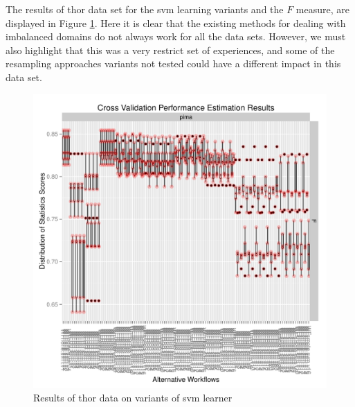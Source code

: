 \documentclass[10pt,a4paper]{article}\usepackage[]{graphicx}\usepackage[]{color}
\makeatletter
\def\maxwidth{ %
  \ifdim\Gin@nat@width>\linewidth
    \linewidth
  \else
    \Gin@nat@width
  \fi
}
\newenvironment{knitrout}{}{} %
\makeatother
\begin{document}
The results of thor data set for the svm learning variants and the $F$ measure, are displayed in Figure \ref{fig:thor_plot1}. Here it is clear that the existing methods for dealing with imbalanced domains do not always work for all the data sets. However, we must also highlight that this was a very restrict set of experiences, and some of the resampling approaches variants not tested could have a different impact in this data set.


\begin{knitrout}\footnotesize
{}\color{fgcolor}\begin{figure}

{\centering \includegraphics[width=\maxwidth]{figures/UBL-thor_plot1-1} 

}

\caption[Results of thor data on variants of svm learner]{Results of thor data on variants of svm learner}\label{fig:thor_plot1}
\end{figure}


\end{knitrout}
\end{document}
